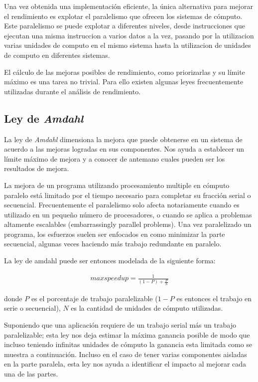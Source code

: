 \documentclass[a4paper]{report}
\begin{document}
Una vez obtenida una implementaci\'on eficiente, la \'unica alternativa para mejorar el rendimiento es explotar el paralelismo que
ofrecen los sistemas de c\'omputo. Este paralelismo se puede explotar a diferentes niveles, desde instrucciones que ejecutan una misma instruccion a varios
datos a la vez, pasando por la utilizacion varias unidades de computo en el mismo sistema hasta la utilizacion de unidades de computo en diferentes sistemas.

\bigskip

El c\'alculo de las mejoras posibles de rendimiento, como priorizarlas y su l\'imite m\'aximo es una tarea no trivial.
Para ello existen algunas leyes frecuentemente utilizadas durante el an\'alisis de rendimiento.

\subsection{Ley de {\it Amdahl}}

 La ley de {\it Amdahl} \cite{amdahl} dimensiona la mejora que puede obtenerse en un sistema de acuerdo a las mejoras logradas en sus
componentes. Nos ayuda a establecer un l\'imite m\'aximo de mejora y a conocer de antemano cuales pueden ser los resultados de mejora.

\bigskip

La mejora de un programa utilizando procesamiento multiple en c\'omputo paralelo est\'a limitado por el tiempo necesario para completar su fracci\'on serial o secuencial. Frecuentemente el paralelismo solo afecta notariamente cuando es utilizado en un peque\~no n\'umero de procesadores, o cuando se aplica a problemas altamente escalables (embarrassingly parallel problems). Una vez paralelizado un programa, los esfuerzos suelen ser enfocados en como minimizar
la parte secuencial, algunas veces haciendo m\'as trabajo redundante en paralelo.

\bigskip

La ley de amdahl puede ser entonces modelada de la siguiente forma:

\begin{eqnarray}
max speedup = \frac{1}{(1-P) + \frac{P}{N}}
\end{eqnarray}

donde $ P $ es el porcentaje de trabajo paralelizable ($ 1-P $ es entonces el trabajo en serie o secuencial), $ N $ es la cantidad de unidades de c\'omputo utilizadas.

\bigskip

Suponiendo que una aplicaci\'on requiere de un trabajo serial más un trabajo paralelizable; esta ley nos deja estimar la m\'axima ganancia posible
de modo que incluso teniendo infinitas unidades de c\'omputo la ganancia esta limitada como se muestra a continuaci\'on. Incluso en el caso de tener varias
componentes aisladas en la parte paralela, esta ley nos ayuda a identificar el impacto al mejorar cada una de las partes.
\end{document}
